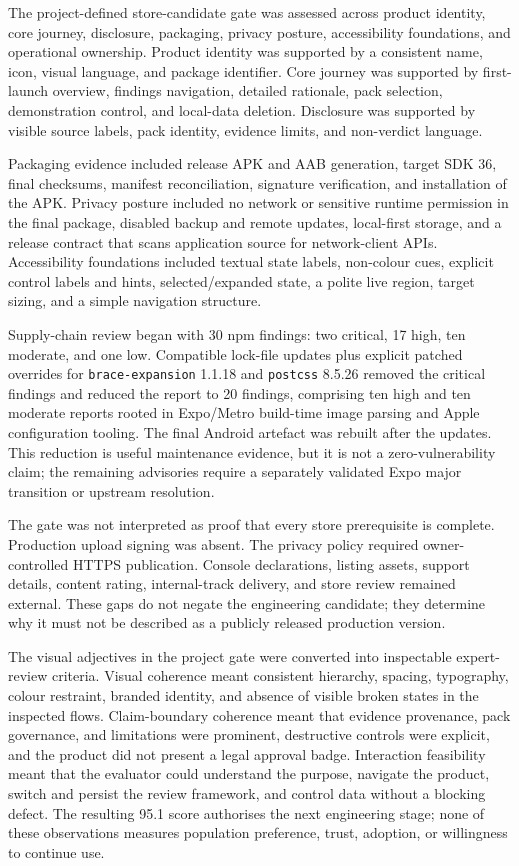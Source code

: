 The project-defined store-candidate gate was assessed across product identity, core journey, disclosure, packaging, privacy posture, accessibility foundations, and operational ownership. Product identity was supported by a consistent name, icon, visual language, and package identifier. Core journey was supported by first-launch overview, findings navigation, detailed rationale, pack selection, demonstration control, and local-data deletion. Disclosure was supported by visible source labels, pack identity, evidence limits, and non-verdict language.

Packaging evidence included release APK and AAB generation, target SDK 36, final checksums, manifest reconciliation, signature verification, and installation of the APK. Privacy posture included no network or sensitive runtime permission in the final package, disabled backup and remote updates, local-first storage, and a release contract that scans application source for network-client APIs. Accessibility foundations included textual state labels, non-colour cues, explicit control labels and hints, selected/expanded state, a polite live region, target sizing, and a simple navigation structure.

Supply-chain review began with 30 npm findings: two critical, 17 high, ten moderate, and one low. Compatible lock-file updates plus explicit patched overrides for \texttt{brace-expansion} 1.1.18 and \texttt{postcss} 8.5.26 removed the critical findings and reduced the report to 20 findings, comprising ten high and ten moderate reports rooted in Expo/Metro build-time image parsing and Apple configuration tooling. The final Android artefact was rebuilt after the updates. This reduction is useful maintenance evidence, but it is not a zero-vulnerability claim; the remaining advisories require a separately validated Expo major transition or upstream resolution.

The gate was not interpreted as proof that every store prerequisite is complete. Production upload signing was absent. The privacy policy required owner-controlled HTTPS publication. Console declarations, listing assets, support details, content rating, internal-track delivery, and store review remained external. These gaps do not negate the engineering candidate; they determine why it must not be described as a publicly released production version.

The visual adjectives in the project gate were converted into inspectable expert-review criteria. Visual coherence meant consistent hierarchy, spacing, typography, colour restraint, branded identity, and absence of visible broken states in the inspected flows. Claim-boundary coherence meant that evidence provenance, pack governance, and limitations were prominent, destructive controls were explicit, and the product did not present a legal approval badge. Interaction feasibility meant that the evaluator could understand the purpose, navigate the product, switch and persist the review framework, and control data without a blocking defect. The resulting 95.1 score authorises the next engineering stage; none of these observations measures population preference, trust, adoption, or willingness to continue use.

